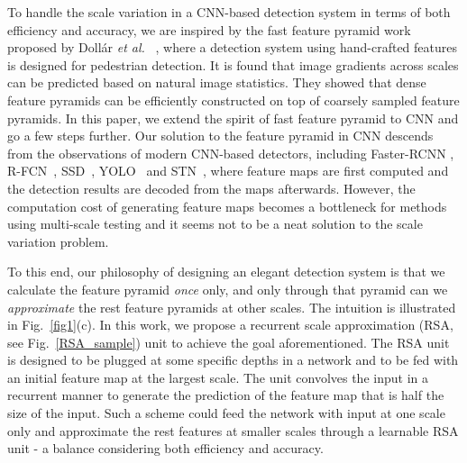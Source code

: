\documentclass[10pt,twocolumn,letterpaper]{article}
\begin{document}
To handle the scale variation in a CNN-based detection system in terms of both efficiency and accuracy, we are inspired by the fast feature pyramid work proposed by Doll{\'a}r \textit{et al.} ~\cite{dollar2014fast}, where a detection system using hand-crafted features is designed for pedestrian detection. 
%
It is found that image gradients across scales can be predicted based on natural image statistics. %
They showed that dense feature pyramids can be efficiently constructed on top of coarsely sampled feature pyramids.  
%
In this paper, we extend the spirit of fast feature pyramid to CNN and go a few steps further. 
%
Our solution to the feature pyramid in CNN descends from the observations of modern CNN-based detectors, including Faster-RCNN \cite{faster_rcnn}, R-FCN~\cite{NIPS2016_6465}, SSD~\cite{liu2016ssd}, YOLO~\cite{redmon2016you} and STN~\cite{chen2016supervised}, where
%
 feature maps are first computed and the detection results are decoded from the maps afterwards. 
%
However, the computation cost of generating  feature maps becomes a bottleneck for methods \cite{overfeat,chen2016supervised} using multi-scale testing and it seems not to be a neat solution to the scale variation problem. 
%


To this end, our philosophy of designing an elegant detection system is that we calculate the feature pyramid 
\textit{once} only, and only through that pyramid can we \textit{approximate} the rest feature pyramids at other scales. The intuition is illustrated  in Fig.~\ref{fig1}(c). 
%
In this work, we propose a recurrent scale approximation (RSA, see Fig.~\ref{RSA_sample}) unit to achieve the goal aforementioned. The RSA unit is designed to be plugged at some specific depths in a network and to be fed with an initial feature map at the largest scale. The unit convolves the input in a recurrent manner to generate the prediction of the feature map that is half the size of the input. Such a scheme could feed the network with input at one scale only and approximate the rest features at smaller scales through a learnable RSA unit - a balance considering both efficiency and accuracy.
\end{document}
